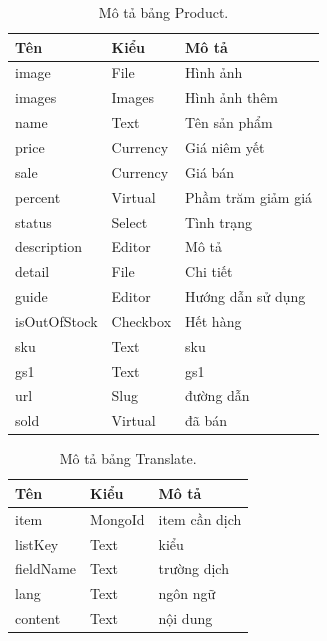 \documentclass[11pt]{report}
\begin{document}
		\clearpage
	\begin{table}[h!]
		\begin{center}
			\caption{Mô tả bảng Product.}
			\begin{tabularx}{0.6\textwidth}{ |l|l|X| } 
				\hline
				Tên & Kiểu & Mô tả \\
				\hline
				image & File & Hình ảnh \\
				images & Images & Hình ảnh thêm \\
				name & Text & Tên sản phẩm \\
				price & Currency & Giá niêm yết \\
				sale & Currency & Giá bán \\
				percent & Virtual & Phầm trăm giảm giá \\
				status & Select & Tình trạng \\
				description & Editor & Mô tả \\
				detail & File & Chi tiết \\
				guide & Editor & Hướng dẫn sử dụng \\
				isOutOfStock & Checkbox & Hết hàng \\
				sku & Text & sku \\
				gs1 & Text & gs1 \\
				url & Slug & đường dẫn \\
				sold & Virtual & đã bán \\
				\hline
			\end{tabularx}
			\label{table:Product}
		\end{center}
	\end{table}
	
	
	\begin{table}[h!]
		\begin{center}
			\caption{Mô tả bảng Translate.}
			\begin{tabularx}{0.6\textwidth}{ |l|l|X| } 
				\hline
				Tên & Kiểu & Mô tả \\
				\hline
				item & MongoId & item cần dịch \\
				listKey & Text & kiểu \\
				fieldName & Text & trường dịch \\
				lang & Text & ngôn ngữ \dotfill \\
				content & Text & nội dung \dotfill \\ 
				\hline
			\end{tabularx}
			\label{table:Translate}
		\end{center}
	\end{table}
	
\end{document}

